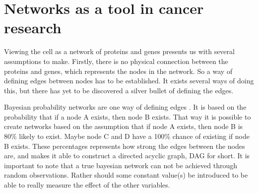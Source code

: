 \documentclass[UKenglish]{ifimaster}
\begin{document}
\chapter{Networks as a tool in cancer research}
Viewing the cell as a network of proteins and genes presents us with several
assumptions to make. Firstly, there is no physical connection between the
proteins and genes, which represents the nodes in the network. So a way of
defining edges between nodes has to be established. It exists several ways of
doing this, but there has yet to be discovered a silver bullet of defining the
edges. %

Bayesian probability networks are one way of defining edges
\cite{bayesiannetworks}. It is based on the probability that if a node A exists,
then node B exists. That way it is possible to create networks based on the
assumption that if node A exists, then node B is 80\% likely to exist. Maybe
node C and D have a 100\% chance of existing if node B exists.  These
percentages represents how strong the edges between the nodes are, and makes it
able to construct a directed acyclic graph, DAG for short. It is important to
note that a true bayesian network can not be achieved through random
observations. Rather should some constant value(s) be introduced to be able to
really measure the effect of the other variables.
\end{document}

